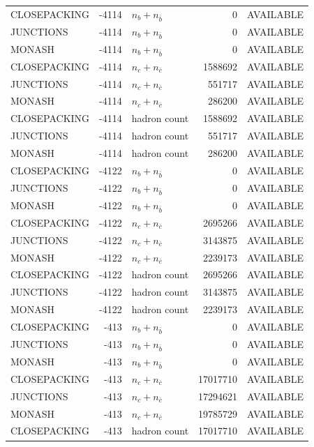 \begin{landscape}
\begin{longtable}{@{}lrlrl@{}}
CLOSEPACKING & -4114 & $n_b+n_{\bar b}$ & \num{0} & AVAILABLE \\
JUNCTIONS & -4114 & $n_b+n_{\bar b}$ & \num{0} & AVAILABLE \\
MONASH & -4114 & $n_b+n_{\bar b}$ & \num{0} & AVAILABLE \\
CLOSEPACKING & -4114 & $n_c+n_{\bar c}$ & \num{1588692} & AVAILABLE \\
JUNCTIONS & -4114 & $n_c+n_{\bar c}$ & \num{551717} & AVAILABLE \\
MONASH & -4114 & $n_c+n_{\bar c}$ & \num{286200} & AVAILABLE \\
CLOSEPACKING & -4114 & hadron count & \num{1588692} & AVAILABLE \\
JUNCTIONS & -4114 & hadron count & \num{551717} & AVAILABLE \\
MONASH & -4114 & hadron count & \num{286200} & AVAILABLE \\
CLOSEPACKING & -4122 & $n_b+n_{\bar b}$ & \num{0} & AVAILABLE \\
JUNCTIONS & -4122 & $n_b+n_{\bar b}$ & \num{0} & AVAILABLE \\
MONASH & -4122 & $n_b+n_{\bar b}$ & \num{0} & AVAILABLE \\
CLOSEPACKING & -4122 & $n_c+n_{\bar c}$ & \num{2695266} & AVAILABLE \\
JUNCTIONS & -4122 & $n_c+n_{\bar c}$ & \num{3143875} & AVAILABLE \\
MONASH & -4122 & $n_c+n_{\bar c}$ & \num{2239173} & AVAILABLE \\
CLOSEPACKING & -4122 & hadron count & \num{2695266} & AVAILABLE \\
JUNCTIONS & -4122 & hadron count & \num{3143875} & AVAILABLE \\
MONASH & -4122 & hadron count & \num{2239173} & AVAILABLE \\
CLOSEPACKING & -413 & $n_b+n_{\bar b}$ & \num{0} & AVAILABLE \\
JUNCTIONS & -413 & $n_b+n_{\bar b}$ & \num{0} & AVAILABLE \\
MONASH & -413 & $n_b+n_{\bar b}$ & \num{0} & AVAILABLE \\
CLOSEPACKING & -413 & $n_c+n_{\bar c}$ & \num{17017710} & AVAILABLE \\
JUNCTIONS & -413 & $n_c+n_{\bar c}$ & \num{17294621} & AVAILABLE \\
MONASH & -413 & $n_c+n_{\bar c}$ & \num{19785729} & AVAILABLE \\
CLOSEPACKING & -413 & hadron count & \num{17017710} & AVAILABLE \\

\end{longtable}
\end{landscape}
